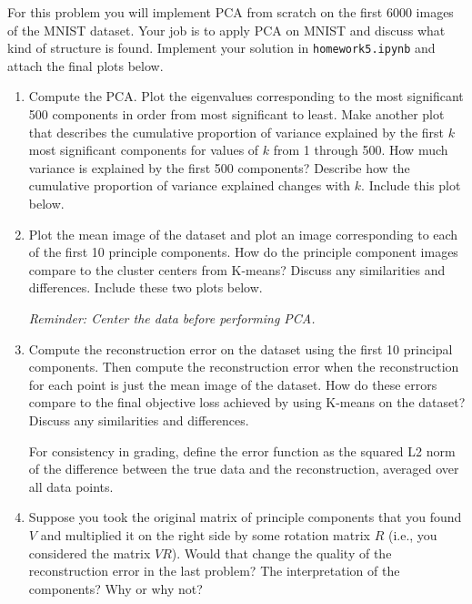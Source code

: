 \documentclass[submit]{../harvardml}
\begin{document}
\begin{problem}

  For this problem you will implement PCA from scratch on the first 6000 images of the MNIST dataset. Your job is to apply PCA on MNIST and discuss what kind of structure is found. Implement your solution in \texttt{homework5.ipynb} and attach the final plots below. \\

  \begin{enumerate}

    \item Compute the PCA. Plot the eigenvalues corresponding to the most
    significant 500 components in order from most significant to
    least. Make another plot that describes the cumulative proportion of
    variance explained by the first $k$ most significant components for
    values of $k$ from 1 through 500.  How much variance is explained by
    the first 500 components?  Describe how the cumulative proportion of
    variance explained changes with $k$.  Include this plot below.

    \item Plot the mean image of the dataset and plot an image
    corresponding to each of the first 10 principle components.  How do
    the principle component images compare to the cluster centers from
    K-means? Discuss any similarities and differences.  Include these
    two plots below.
    
    \textit{Reminder: Center the data before performing PCA.}

    \item Compute the reconstruction error on the dataset using the first 10 principal components. Then compute the reconstruction error when the reconstruction for each point is just the mean
    image of the dataset. How do these errors compare to
    the final objective loss achieved by using K-means on the dataset?
    Discuss any similarities and differences.

    For consistency in grading, define the error function as the squared L2
    norm of the difference between the true data and the reconstruction, averaged over all data points.
  
    \item Suppose you took the original matrix of principle components
    that you found $V$ and multiplied it on the right side by some rotation matrix $R$ (i.e., you considered the matrix $VR$).
    Would that change the quality of the reconstruction error in the
    last problem?  The interpretation of the components?  Why or why
    not?


\end{enumerate}
\end{problem}
\end{document}
